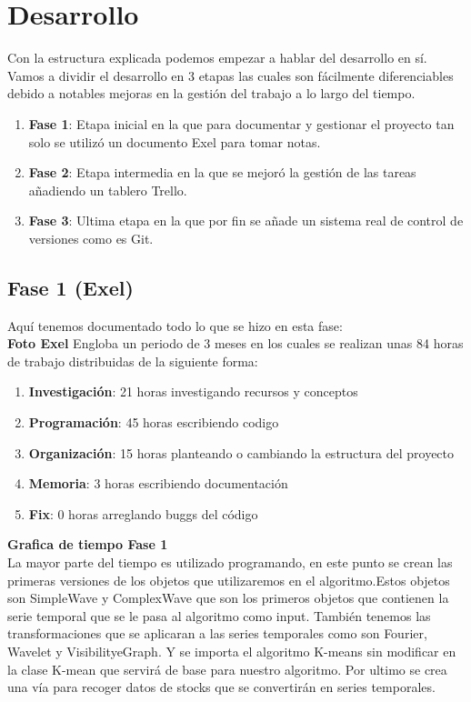 \documentclass[12pt,a4paper]{article}
\begin{document}
\pagebreak

	\section{Desarrollo}
	Con la estructura explicada podemos empezar a hablar del desarrollo en sí. Vamos a dividir el desarrollo en 3 etapas las cuales son fácilmente diferenciables debido a notables mejoras en la gestión del trabajo a lo largo del tiempo.\\
	\begin{enumerate}
	\item \textbf{Fase 1}: Etapa inicial en la que para documentar y gestionar el proyecto tan solo se utilizó un documento Exel para tomar notas.
	\item \textbf{Fase 2}: Etapa intermedia en la que se mejoró la gestión de las tareas añadiendo un tablero Trello.
	\item \textbf{Fase 3}: Ultima etapa en la que por fin se añade un sistema real de control de versiones como es Git.
	\end{enumerate}
	\subsection{Fase 1 (Exel)}
	Aquí tenemos documentado todo lo que se hizo en esta fase:\\
	\textbf{Foto Exel}
	Engloba un periodo de 3 meses en los cuales se realizan unas 84 horas de trabajo distribuidas de la siguiente forma:\\
	\begin{enumerate}
	\item \textbf{Investigación}: 21 horas investigando recursos y conceptos
	\item \textbf{Programación}: 45 horas escribiendo codigo
	\item \textbf{Organización}: 15 horas planteando o cambiando la estructura del proyecto
	\item \textbf{Memoria}: 3 horas escribiendo documentación
	\item \textbf{Fix}: 0 horas arreglando buggs del código
	\end{enumerate}
	\textbf{Grafica de tiempo Fase 1}\\
	La mayor parte del tiempo es utilizado programando, en este punto se crean las primeras versiones de los objetos que utilizaremos en el algoritmo.Estos objetos son SimpleWave y ComplexWave que son los primeros objetos que contienen la serie temporal que se le pasa al algoritmo como input. También tenemos las transformaciones que se aplicaran a las series temporales como son Fourier, Wavelet y VisibilityeGraph. Y se importa el algoritmo K-means sin modificar en la clase K-mean que servirá de base para nuestro algoritmo. Por ultimo se crea una vía para recoger datos de stocks que se convertirán en series temporales.\\
	
\end{document}
